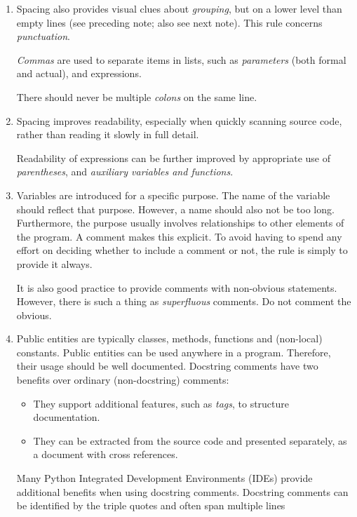 \documentclass{tufte-handout}
\newcommand{\B}{\bfseries}
\begin{document}
\begin{enumerate}
\item Spacing also provides visual clues about \emph{grouping},
\marginpar{\B Spacing~1}
  but on a lower level than empty lines
  (see preceding note; also see next note).
  This rule concerns \emph{punctuation}.
  
  \emph{Commas\/} are used to separate items in lists,
  such as \emph{parameters\/} (both formal and actual),
  and expressions.
  
  There should never be multiple \emph{colons\/} on the same line.
  
\item Spacing improves readability,
\marginpar{\B Spacing~2}
  especially when quickly scanning source code,
  rather than reading it slowly in full detail.
  
  Readability of expressions can be further improved by appropriate
  use of \emph{parentheses}, and \emph{auxiliary variables and functions}.

\item Variables are introduced for a specific purpose.
\marginpar{\B Comments}
  The name of the variable should reflect that purpose.
  However, a name should also not be too long.
  Furthermore, the purpose usually involves relationships to other
  elements of the program.
  A comment makes this explicit.
  To avoid having to spend any effort on deciding whether to include a comment or not,
  the rule is simply to provide it always.
  
  It is also good practice to provide comments with non-obvious statements.
  However, there is such a thing as \emph{superfluous\/} comments.
  Do not comment the obvious.

\item Public entities are typically classes, methods, functions 
\marginpar{\B Docstring}
  and (non-local) constants.
  Public entities can be used anywhere in a program.
  Therefore,
  their usage should be well documented.
  Docstring comments have two benefits over ordinary (non-docstring) comments:
  \begin{itemize}
  \item They support additional features, such as \emph{tags},
    to structure documentation.
  \item They can be extracted from the source code and presented separately,
    as a document with cross references.
  \end{itemize}
  Many Python Integrated Development Environments (IDEs)
  provide additional benefits when using docstring comments. 
  Docstring comments can be identified by the triple quotes and often span multiple lines 
  

\end{enumerate}
\end{document}
